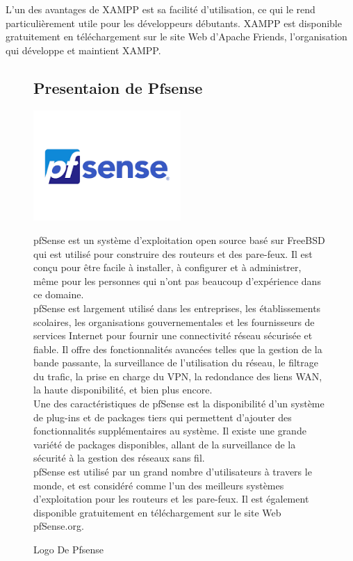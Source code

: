 L'un des avantages de XAMPP est sa facilité d'utilisation, ce qui le rend particulièrement utile pour les développeurs débutants. XAMPP est disponible gratuitement en téléchargement sur le site Web d'Apache Friends, l'organisation qui développe et maintient XAMPP.


\begin{figure}[h]
	\subsection{Presentaion de Pfsense}
	 \begin{center}
	  	\includegraphics[width=0.5\textwidth]{PhotoMemoire/pfsense.png}
	  \caption{Logo De Pfsense \cite{18}}
	 \end{center}
	 pfSense est un système d'exploitation open source basé sur FreeBSD qui est utilisé pour construire des routeurs et des pare-feux. Il est conçu pour être facile à installer, à configurer et à administrer, même pour les personnes qui n'ont pas beaucoup d'expérience dans ce domaine.\\
	 
	 pfSense est largement utilisé dans les entreprises, les établissements scolaires, les organisations gouvernementales et les fournisseurs de services Internet pour fournir une connectivité réseau sécurisée et fiable. Il offre des fonctionnalités avancées telles que la gestion de la bande passante, la surveillance de l'utilisation du réseau, le filtrage du trafic, la prise en charge du VPN, la redondance des liens WAN, la haute disponibilité, et bien plus encore.\\
	 
	 Une des caractéristiques de pfSense est la disponibilité d'un système de plug-ins et de packages tiers qui permettent d'ajouter des fonctionnalités supplémentaires au système. Il existe une grande variété de packages disponibles, allant de la surveillance de la sécurité à la gestion des réseaux sans fil.\\
	 
	 pfSense est utilisé par un grand nombre d'utilisateurs à travers le monde, et est considéré comme l'un des meilleurs systèmes d'exploitation pour les routeurs et les pare-feux. Il est également disponible gratuitement en téléchargement sur le site Web pfSense.org.\\
	 
\end{figure}

